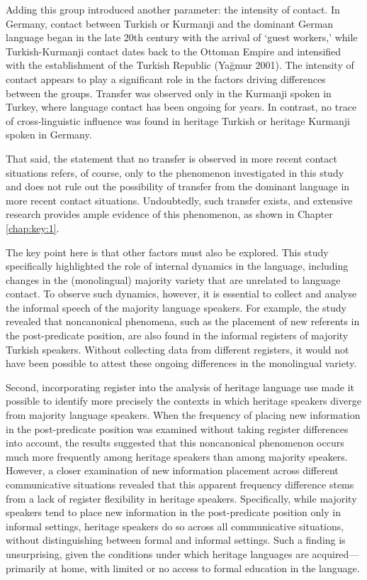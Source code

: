 Adding this group introduced another parameter: the intensity of contact. In Germany, contact between Turkish or Kurmanji and the dominant German language began in the late 20th century with the arrival of ‘guest workers,’ while Turkish-Kurmanji contact dates back to the Ottoman Empire and intensified with the establishment of the Turkish Republic (Yağmur 2001). The intensity of contact appears to play a significant role in the factors driving differences between the groups. Transfer was observed only in the Kurmanji spoken in Turkey, where language contact has been ongoing for years. In contrast, no trace of cross-linguistic influence was found in heritage Turkish or heritage Kurmanji spoken in Germany.

That said, the statement that no transfer is observed in more recent contact situations refers, of course, only to the phenomenon investigated in this study and does not rule out the possibility of transfer from the dominant language in more recent contact situations. Undoubtedly, such transfer exists, and extensive research provides ample evidence of this phenomenon, as shown in Chapter \ref{chap:key:1}.

The key point here is that other factors must also be explored. This study specifically highlighted the role of internal dynamics in the language, including changes in the (monolingual) majority variety that are unrelated to language contact. To observe such dynamics, however, it is essential to collect and analyse the informal speech of the majority language speakers. For example, the study revealed that noncanonical phenomena, such as the placement of new referents in the post-predicate position, are also found in the informal registers of majority Turkish speakers. Without collecting data from different registers, it would not have been possible to attest these ongoing differences in the monolingual variety.

Second, incorporating register into the analysis of heritage language use made it possible to identify more precisely the contexts in which heritage speakers diverge from majority language speakers. When the frequency of placing new information in the post-predicate position was examined without taking register differences into account, the results suggested that this noncanonical phenomenon occurs much more frequently among heritage speakers than among majority speakers. However, a closer examination of new information placement across different communicative situations revealed that this apparent frequency difference stems from a lack of register flexibility in heritage speakers. Specifically, while majority speakers tend to place new information in the post-predicate position only in informal settings, heritage speakers do so across all communicative situations, without distinguishing between formal and informal settings. Such a finding is unsurprising, given the conditions under which heritage languages are acquired—primarily at home, with limited or no access to formal education in the language.


